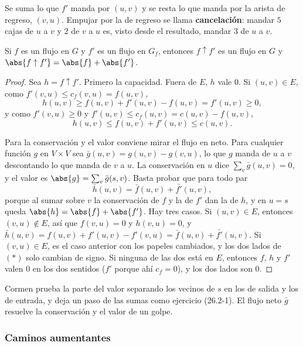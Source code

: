\documentclass[11pt,letterpaper]{article}
\begin{document}
Se suma lo que $f'$ manda por $(u, v)$ y se resta lo que manda por la
arista de regreso, $(v, u)$. Empujar por la de regreso se llama
\textbf{cancelación}: mandar $5$ cajas de $u$ a $v$ y $2$ de $v$ a $u$
es, visto desde el resultado, mandar $3$ de $u$ a $v$.

\begin{lema}\label{lem:flujo-aumento}
  Si $f$ es un flujo en $G$ y $f'$ es un flujo en $G_f$, entonces
  $f \uparrow f'$ es un flujo en $G$ y
  $\abs{f \uparrow f'} = \abs{f} + \abs{f'}$.
\end{lema}

\begin{proof}
  Sea $h = f \uparrow f'$. Primero la capacidad. Fuera de $E$, $h$
  vale $0$. Si $(u, v) \in E$, como $f'(v, u) \le c_f(v, u) =
  f(u, v)$,
  \[
    h(u, v) \ge f(u, v) + f'(u, v) - f(u, v) = f'(u, v) \ge 0 ,
  \]
  y como $f'(v, u) \ge 0$ y $f'(u, v) \le c_f(u, v) = c(u, v) -
  f(u, v)$,
  \[
    h(u, v) \le f(u, v) + f'(u, v) \le c(u, v) .
  \]

  Para la conservación y el valor conviene mirar el flujo en neto.
  Para cualquier función $g$ en $V \times V$ sea
  $\bar{g}(u, v) = g(u, v) - g(v, u)$, lo que $g$ manda de $u$ a $v$
  descontando lo que manda de $v$ a $u$. La conservación en $u$ dice
  $\sum_{v} \bar{g}(u, v) = 0$, y el valor es
  $\abs{g} = \sum_{v} \bar{g}(s, v)$. Basta probar que para todo par
  \[
    \bar{h}(u, v) = \bar{f}(u, v) + \bar{f'}(u, v) , \tag{$*$}
  \]
  porque al sumar sobre $v$ la conservación de $f$ y la de $f'$ dan la
  de $h$, y en $u = s$ queda $\abs{h} = \abs{f} + \abs{f'}$. Hay tres
  casos. Si $(u, v) \in E$, entonces $(v, u) \notin E$, así que
  $f(v, u) = 0$ y $h(v, u) = 0$, y
  $\bar{h}(u, v) = f(u, v) + f'(u, v) - f'(v, u) = \bar{f}(u, v) +
  \bar{f'}(u, v)$. Si $(v, u) \in E$, es el caso anterior con los
  papeles cambiados, y los dos lados de $(*)$ solo cambian de signo.
  Si ninguna de las dos está en $E$, entonces $f$, $h$ y $f'$ valen
  $0$ en los dos sentidos ($f'$ porque ahí $c_f = 0$), y los dos lados
  son $0$.
\end{proof}

Cormen prueba la parte del valor separando los vecinos de $s$ en los
de salida y los de entrada, y deja un paso de las sumas como ejercicio
(26.2-1). El flujo neto $\bar{g}$ resuelve la conservación y el valor
de un golpe.

\subsubsection*{Caminos aumentantes}
\end{document}
